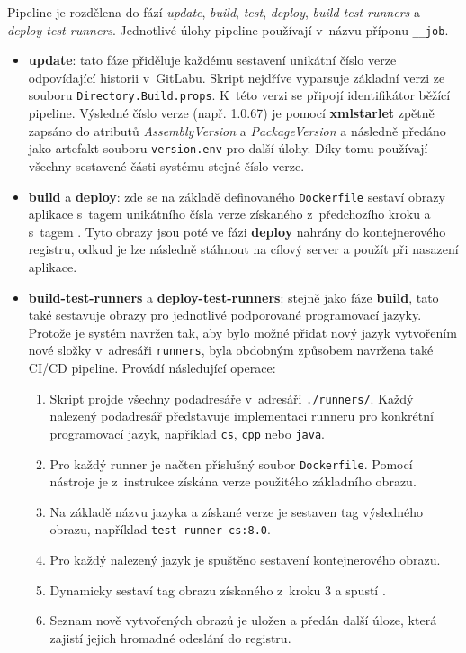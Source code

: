 \documentclass[
  biblatex,
  figures,
  tables,
  glossaries,
  index
]{kidiplom}
\begin{document}
Pipeline je rozdělena do fází \textit{update}, \textit{build}, \textit{test}, \textit{deploy}, \textit{build-test-runners} a \textit{deploy-test-runners}. Jednotlivé úlohy pipeline používají v~názvu příponu \texttt{\_\_job}.

\begin{itemize}
	\item \textbf{update}: tato fáze přiděluje každému sestavení unikátní číslo verze odpovídající historii v~GitLabu. Skript nejdříve vyparsuje základní verzi ze souboru \texttt{Directory.Build.props}. K~této verzi se připojí identifikátor běžící pipeline. Výsledné číslo verze (např. 1.0.67) je pomocí \textbf{xmlstarlet} zpětně zapsáno do atributů \textit{AssemblyVersion} a \textit{PackageVersion} a následně předáno jako artefakt souboru \texttt{version.env} pro další úlohy. Díky tomu používají všechny sestavené části systému stejné číslo verze.

	\item \textbf{build} a \textbf{deploy}: zde se na základě definovaného \texttt{Dockerfile} sestaví obrazy aplikace s~tagem unikátního čísla verze získaného z~předchozího kroku a s~tagem . Tyto obrazy jsou poté ve fázi \textbf{deploy} nahrány do kontejnerového registru, odkud je lze následně stáhnout na cílový server a použít při nasazení aplikace.

	\item \textbf{build-test-runners} a \textbf{deploy-test-runners}: stejně jako fáze \textbf{build}, tato také sestavuje obrazy pro jednotlivé podporované programovací jazyky. Protože je systém navržen tak, aby bylo možné přidat nový jazyk vytvořením nové složky v~adresáři \texttt{runners}, byla obdobným způsobem navržena také CI/CD pipeline. Provádí následující operace:
	\begin{enumerate}
		\item Skript projde všechny podadresáře v~adresáři \texttt{./runners/}. Každý nalezený podadresář představuje implementaci runneru pro konkrétní programovací jazyk, například \texttt{cs}, \texttt{cpp} nebo \texttt{java}.
		\item Pro každý runner je načten příslušný soubor \texttt{Dockerfile}. Pomocí nástroje  je z~instrukce  získána verze použitého základního obrazu.
		\item Na základě názvu jazyka a získané verze je sestaven tag výsledného obrazu, například \texttt{test-runner-cs:8.0}.
		\item Pro každý nalezený jazyk je spuštěno sestavení kontejnerového obrazu.
		\item Dynamicky sestaví tag obrazu získaného z~kroku 3 a spustí .
		\item Seznam nově vytvořených obrazů je uložen a předán další úloze, která zajistí jejich hromadné odeslání do registru. 
	\end{enumerate}
\end{itemize}
\end{document}
